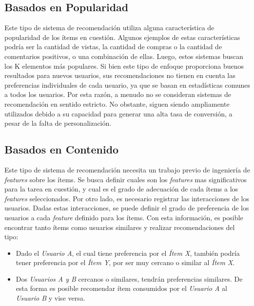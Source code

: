 \documentclass[11pt,a4paper,twoside]{thesis}
\begin{document}
\subsection{Basados en Popularidad}

Este tipo de sistema de recomendación utiliza alguna característica de
popularidad de los ítems en cuestión. Algunos ejemplos de estas características
podría ser la cantidad de vistas, la cantidad de compras o la cantidad de
comentarios positivos, o una combinación de ellas. Luego, estos sistemas buscan
los K elementos más populares. Si bien este tipo de enfoque proporciona buenos
resultados para nuevos usuarios, sus recomendaciones no tienen en cuenta las
preferencias individuales de cada usuario, ya que se basan en estadísticas
comunes a todos los usuarios. Por esta razón, a menudo no se consideran
sistemas de recomendación en sentido estricto. No obstante, siguen siendo
ampliamente utilizados debido a su capacidad para generar una alta tasa de
conversión, a pesar de la falta de personalización.

\subsection{Basados en Contenido}

Este tipo de sistema de recomendación necesita un trabajo previo de ingeniería
de \textit{features} sobre los ítems. Se busca definir cuales son los
\textit{features} mas significativos para la tarea en cuestión, y cual es el
grado de adecuación de cada ítems a los \textit{features} seleccionados. Por
otro lado, es necesario registrar las interacciones de los usuarios. Dadas
estas interacciones, se puede definir el grado de preferencia de los usuarios a
cada \textit{feature} definido para los ítems. Con esta información, es posible
encontrar tanto ítems como usuarios similares y realizar recomendaciones del
tipo:

\begin{itemize}
	\item Dado el \textit{Usuario A}, el cual tiene preferencia por el \textit{Ítem X},
	      también podría tener preferencia por el \textit{Ítem Y}, por ser muy cercano o
	      similar al \textit{Ítem X}.
	\item Dos \textit{Usuarios A y B} cercanos o similares, tendrán preferencias
	      similares. De esta forma es posible recomendar ítem consumidos por el
	      \textit{Usuario A} al \textit{Usuario B} y vise versa.
\end{itemize}
\end{document}
